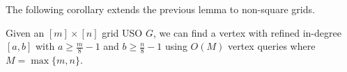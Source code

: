 \documentclass[runningheads,a4paper]{llncs}
\newcommand{\indegree}{refined in-degree\xspace}
\begin{document}
The following corollary extends the previous lemma to non-square grids.

\begin{corollary}\label{corollary: n/4 indegree}
  Given an $[m]\times [n]$ grid USO $G$, we can find a vertex with \indegree $[a,b]$ with $a \geq \frac{m}{8} - 1$ and  $b \geq \frac{n}{8} - 1$ using $O(M)$ vertex queries where $M = \max\{m,n\}$.
\end{corollary}


\end{document}
